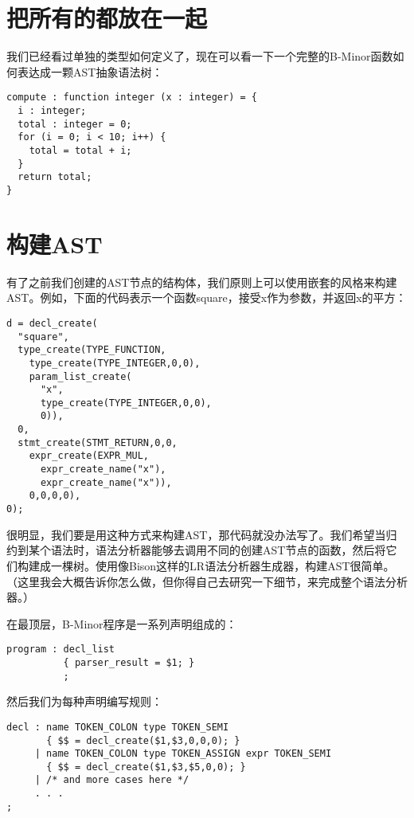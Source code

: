 \documentclass[cn,11pt,chinese]{elegantbook}
\begin{document}
\section{把所有的都放在一起}

我们已经看过单独的类型如何定义了，现在可以看一下一个完整的B-Minor函数如何表达成一颗AST抽象语法树：

\begin{verbatim}
compute : function integer (x : integer) = {
  i : integer;
  total : integer = 0;
  for (i = 0; i < 10; i++) {
    total = total + i;
  }
  return total;
}
\end{verbatim}

\section{构建AST}

有了之前我们创建的AST节点的结构体，我们原则上可以使用嵌套的风格来构建AST。例如，下面的代码表示一个函数square，接受x作为参数，并返回x的平方：

\begin{verbatim}
d = decl_create(
  "square",
  type_create(TYPE_FUNCTION,
    type_create(TYPE_INTEGER,0,0),
    param_list_create(
      "x",
      type_create(TYPE_INTEGER,0,0),
      0)),
  0,
  stmt_create(STMT_RETURN,0,0,
    expr_create(EXPR_MUL,
      expr_create_name("x"),
      expr_create_name("x")),
    0,0,0,0),
0);
\end{verbatim}

很明显，我们要是用这种方式来构建AST，那代码就没办法写了。我们希望当归约到某个语法时，语法分析器能够去调用不同的创建AST节点的函数，然后将它们构建成一棵树。使用像Bison这样的LR语法分析器生成器，构建AST很简单。（这里我会大概告诉你怎么做，但你得自己去研究一下细节，来完成整个语法分析器。）

在最顶层，B-Minor程序是一系列声明组成的：

\begin{verbatim}
program : decl_list
          { parser_result = $1; }
          ;
\end{verbatim}

然后我们为每种声明编写规则：

\begin{verbatim}
decl : name TOKEN_COLON type TOKEN_SEMI
       { $$ = decl_create($1,$3,0,0,0); }
     | name TOKEN_COLON type TOKEN_ASSIGN expr TOKEN_SEMI
       { $$ = decl_create($1,$3,$5,0,0); }
     | /* and more cases here */
     . . .
;
\end{verbatim}
\end{document}
